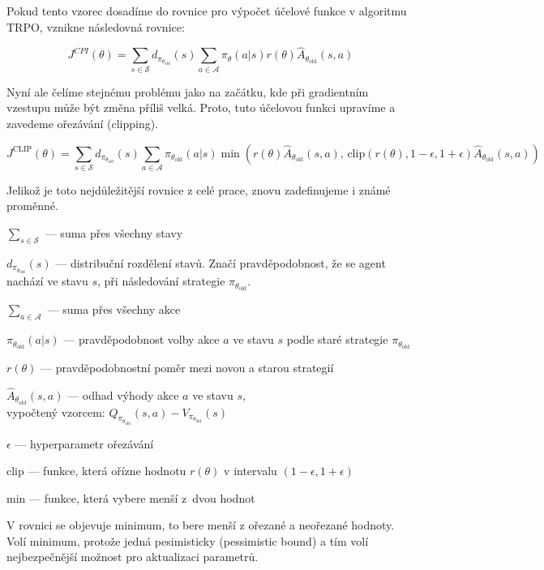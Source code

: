 Pokud tento vzorec dosadíme do rovnice pro výpočet účelové funkce v algoritmu TRPO, vznikne následovná rovnice:

\begin{equation}
    J^{CPI}(\theta) = \sum_{s \in \mathcal{S}} d_{\pi_{\theta_{\text{old}}}}(s) \sum_{a \in \mathcal{A}} \pi_{\theta}(a \vert s) r(\theta) \hat{A}_{\theta_{\text{old}}}(s, a)
\end{equation}

Nyní ale čelíme stejnému problému jako na začátku, kde při gradientním vzestupu může být změna příliš velká.
Proto, tuto účelovou funkci upravíme a zavedeme ořezávání (clipping).

\begin{equation}
  J^{\text{CLIP}}(\theta) = \sum_{s \in \mathcal{S}} d_{\pi_{\theta_{\text{old}}}}(s) \sum_{a \in \mathcal{A}} \pi_{\theta_{\text{old}}}(a|s) \min \left( r(\theta) \hat{A}_{\theta_{\text{old}}}(s, a), \, \text{clip} \left( r(\theta), 1 - \epsilon, 1 + \epsilon \right) \hat{A}_{\theta_{\text{old}}}(s, a) \right)
\end{equation}

Jelikož je toto nejdůležitější rovnice z celé prace, znovu zadefinujeme i známé proměnné.
\begin{myitemize}
  \item $\sum_{s \in \mathcal{S}}$ --- suma přes všechny stavy
  \item $d_{\pi_{\theta_{\text{old}}}}(s)$ --- distribuční rozdělení stavů. Značí pravděpodobnost, že se agent nachází ve stavu $s$, při následování strategie $\pi_{\theta_{\text{old}}}$.
  \item $\sum_{a \in \mathcal{A}}$ --- suma přes všechny akce
  \item $\pi_{\theta_{\text{old}}}(a|s)$ --- pravděpodobnost volby akce $a$ ve stavu $s$ podle staré strategie $\pi_{\theta_{\text{old}}}$
  \item $r(\theta)$ --- pravděpodobnostní poměr mezi novou a starou strategií
  \item $\hat{A}_{\theta_{\text{old}}}(s, a)$ --- odhad výhody akce $a$ ve stavu $s$,\\vypočtený vzorcem: $Q_{\pi_{\theta_{\text{old}}}}(s, a) - V_{\pi_{\theta_{\text{old}}}}(s)$
  \item $\epsilon$ --- hyperparametr ořezávání
  \item clip --- funkce, která ořízne hodnotu $r(\theta)$ v intervalu $(1-\epsilon, 1+\epsilon)$
  \item min --- funkce, která vybere menší z~dvou hodnot
\end{myitemize}
V rovnici se objevuje minimum, to bere menší z ořezané a neořezané hodnoty.
Volí minimum, protože jedná pesimisticky (pessimistic bound) a tím volí nejbezpečnější možnost pro aktualizaci parametrů.

